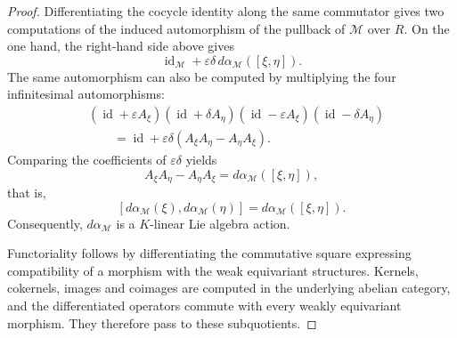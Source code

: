 \documentclass[11pt]{amsart}
\theoremstyle{plain}
\theoremstyle{definition}
\theoremstyle{remark}
\begin{document}
\begin{proof}
Differentiating the cocycle identity along the same commutator gives two
computations of the induced automorphism of the pullback of \(\mathcal M\) over
\(R\). On the one hand, the right-hand side above gives
\[
  \operatorname{id}_{\mathcal M}
  +\varepsilon\delta\,d\alpha_{\mathcal M}([\xi,\eta]).
\]
The same automorphism can also be computed by multiplying the four infinitesimal automorphisms:
\[
\begin{aligned}
 &(\operatorname{id}+\varepsilon A_\xi)
 (\operatorname{id}+\delta A_\eta)
 (\operatorname{id}-\varepsilon A_\xi)
 (\operatorname{id}-\delta A_\eta) \\
 &\qquad =
 \operatorname{id}+\varepsilon\delta(A_\xi A_\eta-A_\eta A_\xi).
\end{aligned}
\]
Comparing the coefficients of \(\varepsilon\delta\) yields
\[
  A_\xi A_\eta-A_\eta A_\xi
  =d\alpha_{\mathcal M}([\xi,\eta]),
\]
that is,
\[
  [d\alpha_{\mathcal M}(\xi),d\alpha_{\mathcal M}(\eta)]
  =d\alpha_{\mathcal M}([\xi,\eta]).
\]
Consequently, \(d\alpha_{\mathcal M}\) is a \(K\)-linear Lie algebra action.

Functoriality follows by differentiating the commutative square expressing
compatibility of a morphism with the weak equivariant structures. Kernels,
cokernels, images and coimages are computed in the underlying abelian category,
and the differentiated operators commute with every weakly equivariant
morphism. They therefore pass to these subquotients.
\end{proof}
\end{document}
